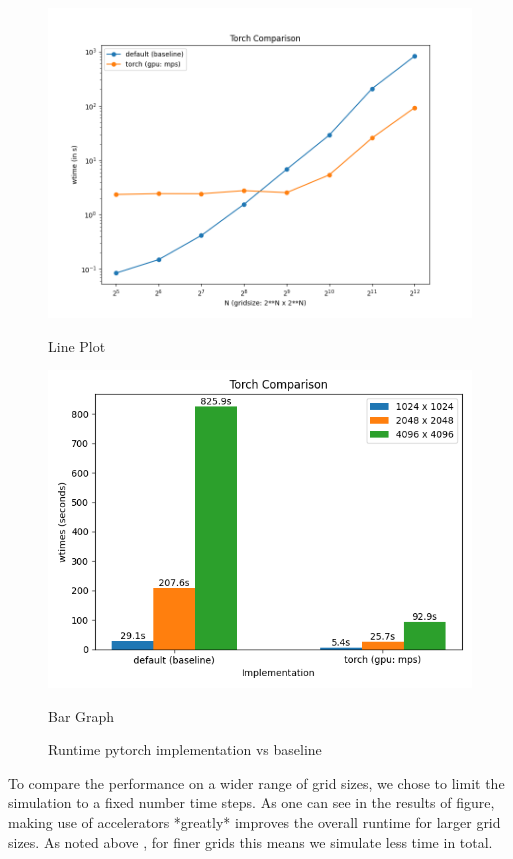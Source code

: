 \documentclass[a4paper,10pt]{article}
\begin{document}
\begin{figure}[h]
   \begin{minipage}{0.5\textwidth}
       \centering
       \includegraphics[width=\linewidth]{images/torch/torch_mps_runtime.png}
      \caption{Line Plot}
       \label{fig:torch_plot}
   \end{minipage}
   \hspace{0.1cm}
   \begin{minipage}{0.5\textwidth}
       \centering
       \includegraphics[width=\linewidth]{images/torch/torch_mps_bars.png}
      \caption{Bar Graph}
      \label{fig:torch_bar}
  \end{minipage}
  \caption{Runtime pytorch implementation vs baseline}
  \label{fig:torch_runtime}
\end{figure}
To compare the performance on a wider range of grid sizes, we chose to limit the simulation to a fixed number time steps.
As one can see in the results of figure, making use of accelerators *greatly* improves the overall runtime for larger grid sizes.
As noted above , for finer grids this means we simulate less time in total.
\end{document}
